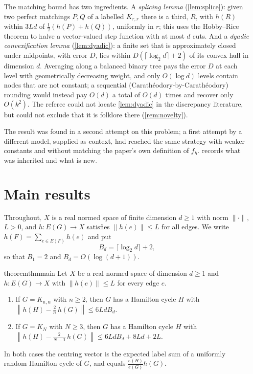\documentclass[11pt,a4paper]{article}
\theoremstyle{plain}
\theoremstyle{definition}
\theoremstyle{remark}
\newcommand{\norm}[1]{\left\|#1\right\|}
\begin{document}
The matching bound has two ingredients. A \emph{splicing lemma} (\cref{lem:splice}): given two perfect matchings $P,Q$ of a labelled $K_{r,r}$ there is a third, $R$, with $h(R)$ within $3Ld$ of $\frac12(h(P)+h(Q))$, uniformly in $r$; this uses the Hobby--Rice theorem \cite{HobbyRice65,AlonWest86} to halve a vector-valued step function with at most $d$ cuts. And a \emph{dyadic convexification lemma} (\cref{lem:dyadic}): a finite set that is approximately closed under midpoints, with error $D$, lies within $D(\lceil\log_2 d\rceil+2)$ of its convex hull in dimension $d$. Averaging along a balanced binary tree pays the error $D$ at each level with geometrically decreasing weight, and only $O(\log d)$ levels contain nodes that are not constant; a sequential (Carathéodory-by-Carathéodory) rounding would instead pay $O(d)$ a total of $O(d)$ times and recover only $O(k^2)$. The referee could not locate \cref{lem:dyadic} in the discrepancy literature, but could not exclude that it is folklore there (\cref{rem:novelty}).

The result was found in a second attempt on this problem; a first attempt by a different model, supplied as context, had reached the same strategy with weaker constants and without matching the paper's own definition of $f_h$.  records what was inherited and what is new.

\section{Main results}\label{sec:main}

Throughout, $X$ is a real normed space of finite dimension $d\ge1$ with norm $\|\cdot\|$, $L>0$, and $h\colon E(G)\to X$ satisfies $\|h(e)\|\le L$ for all edges. We write $h(F)=\sum_{e\in E(F)}h(e)$ and put
\begin{equation}\label{eq:Bd}
 B_d=\lceil\log_2d\rceil+2 ,
\end{equation}
so that $B_1=2$ and $B_d=O(\log(d+1))$.

\begin{restatable}{theorem}{thmmain}\label{thm:main}
Let $X$ be a real normed space of dimension $d\ge1$ and $h\colon E(G)\to X$ with $\|h(e)\|\le L$ for every edge $e$.
\begin{enumerate}[label=\textup{(\roman*)},nosep]
\item If $G=K_{n,n}$ with $n\ge2$, then $G$ has a Hamilton cycle $H$ with
 $\displaystyle\norm{h(H)-\tfrac2n\,h(G)}\le 6LdB_d$.
\item If $G=K_N$ with $N\ge3$, then $G$ has a Hamilton cycle $H$ with
 $\displaystyle\norm{h(H)-\tfrac2{N-1}\,h(G)}\le 6LdB_d+8Ld+2L$.
\end{enumerate}
In both cases the centring vector is the expected label sum of a uniformly random Hamilton cycle of $G$, and equals $\frac{e(H)}{e(G)}h(G)$.
\end{restatable}
\end{document}
